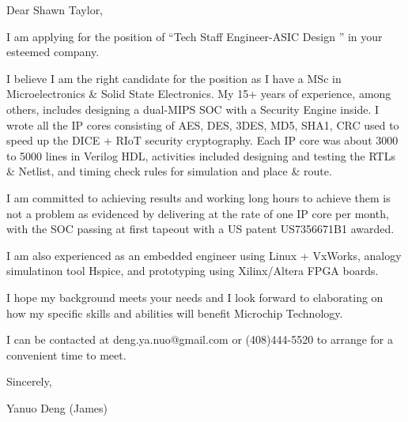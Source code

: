 \vskip 30pt

{ \medbreak } 
{ 
Dear Shawn Taylor,
}

{ \bigbreak } 
I am applying for the position of ``Tech Staff Engineer-ASIC Design '' in your esteemed company.

{ \bigbreak } 
I believe I am the right candidate for the position as I have a MSc in Microelectronics \& Solid State Electronics.
My 15+ years of experience, among others, 
includes designing a dual-MIPS SOC with a Security Engine inside. 
I wrote all the IP cores consisting of AES, DES, 3DES, MD5, SHA1, CRC 
used to speed up the DICE + RIoT security cryptography.
Each IP core was about 3000 to 5000 lines in Verilog HDL, 
activities included designing and testing the RTLs \& Netlist,
and timing check rules for simulation and place \& route.

{ \bigbreak } 
I am committed to achieving results and working long hours 
to achieve them is not a problem as evidenced by 
delivering at the rate of one IP core per month,
with the SOC passing at first tapeout
with a US patent US7356671B1 awarded.

{ \bigbreak } 
I am also experienced as an embedded engineer using Linux + VxWorks, 
analogy simulatinon tool Hspice, 
and prototyping using Xilinx/Altera FPGA boards.

{ \bigbreak } 
I hope my background meets your needs and I look
forward to elaborating on how my specific skills and abilities will benefit Microchip Technology.

{ \bigbreak } 
I can be contacted at deng.ya.nuo@gmail.com
or (408)444-5520 to arrange for a convenient time to meet.

{ \bigbreak } 




\vskip 60pt

{ \bigbreak } 
Sincerely,

Yanuo Deng (James)

\bye
